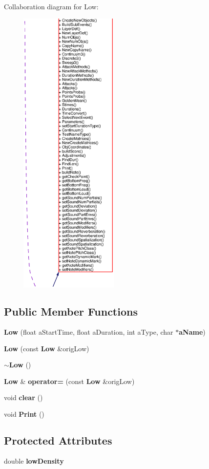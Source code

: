 Collaboration diagram for Low:\begin{figure}[H]
\begin{center}
\leavevmode
\includegraphics[width=139pt]{classLow__coll__graph}
\end{center}
\end{figure}
\subsection*{Public Member Functions}
\begin{CompactItemize}
\item 
{\bf Low} (float a\-Start\-Time, float a\-Duration, int a\-Type, char $\ast${\bf a\-Name})
\item 
{\bf Low} (const  {\bf Low} \&orig\-Low)
\item 
{\bf $\sim$Low} ()
\item 
{\bf Low} \& {\bf operator=} (const  {\bf Low} \&orig\-Low)
\item 
void {\bf clear} ()
\item 
void {\bf Print} ()
\end{CompactItemize}
\subsection*{Protected Attributes}
\begin{CompactItemize}
\item 
double {\bf low\-Density}
\end{CompactItemize}


